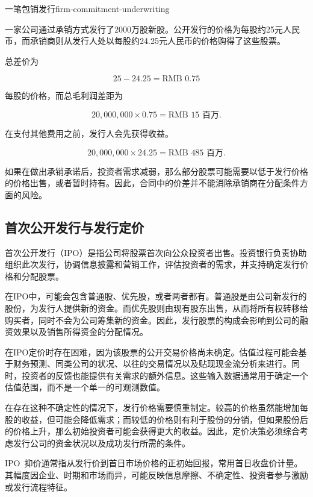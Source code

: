 \begin{example}{一笔包销发行}{firm-commitment-underwriting}

一家公司通过承销方式发行了2000万股新股。公开发行的价格为每股约25元人民币，而承销商则从发行人处以每股约24.25元人民币的价格购得了这些股票。

总差价为

\[
25-24.25=\text{RMB }0.75
\]

每股的价格，而总毛利润差距为

\[
20{,}000{,}000\times0.75=\text{RMB }15\text{ 百万}.
\]

在支付其他费用之前，发行人会先获得收益。

\[
20{,}000{,}000\times24.25=\text{RMB }485\text{ 百万}.
\]

如果在做出承销承诺后，投资者需求减弱，那么部分股票可能需要以低于发行价格的价格出售，或者暂时持有。因此，合同中的价差并不能消除承销商在分配条件方面的风险。

\end{example}


\subsection{首次公开发行与发行定价}

首次公开发行（IPO）是指公司将股票首次向公众投资者出售。投资银行负责协助组织此次发行，协调信息披露和营销工作，评估投资者的需求，并支持确定发行价格和分配股票。

在IPO中，可能会包含普通股、优先股，或者两者都有。普通股是由公司新发行的股份，为发行人提供新的资金。而优先股则由现有股东出售，从而将所有权转移给购买者，同时不会为公司筹集新的资金。因此，发行股票的构成会影响到公司的融资效果以及销售所得资金的分配情况。

在IPO定价时存在困难，因为该股票的公开交易价格尚未确定。估值过程可能会基于财务预测、同类公司的状况、以往的交易情况以及贴现现金流分析来进行。同时，投资者的反馈也能提供有关需求的额外信息。这些输入数据通常用于确定一个估值范围，而不是一个单一的可观测数值。

在存在这种不确定性的情况下，发行价格需要慎重制定。较高的价格虽然能增加每股的收益，但可能会降低需求；而较低的价格则有利于股份的分销，但如果股份后的价格上升，那么初始投资者可能会获得更大的收益。因此，定价决策必须综合考虑发行公司的资金状况以及成功发行所需的条件。

IPO~抑价通常指从发行价到首日市场价格的正初始回报，常用首日收盘价计量。其幅度因企业、时期和市场而异，可能反映信息摩擦、不确定性、投资者参与激励或发行流程特征。

